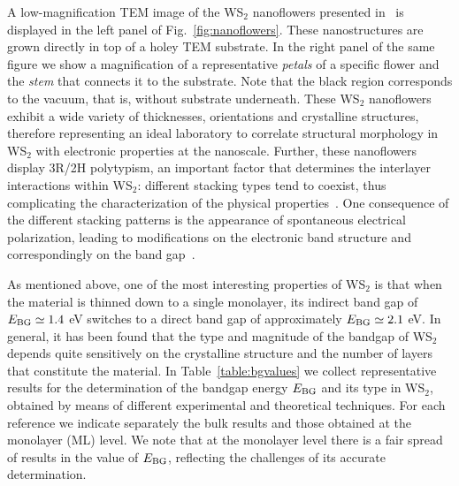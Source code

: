 A low-magnification TEM image of the WS$_2$ nanoflowers presented in~\cite{SabryaWS2} is displayed
in the left panel of Fig.~\ref{fig:nanoflowers}.
%
These nanostructures are grown directly in top of a holey TEM substrate.
%
In the right panel of the same figure we show a magnification of a
      representative {\it petals}
      of a specific flower and the {\it stem} that connects it to the substrate.
      Note that the black region corresponds to the vacuum, that is, without
      substrate underneath.
%
These WS$_2$ nanoflowers exhibit a wide variety of thicknesses, orientations
and crystalline structures, therefore representing an ideal laboratory to correlate
structural morphology in WS$_2$ with electronic properties at the nanoscale.
%
Further, these nanoflowers display 3R/2H polytypism,
an important factor that determines the interlayer
interactions within WS$_2$: different stacking types tend to coexist, 
thus complicating the characterization of the physical properties~\cite{Na:2018}.
%
One consequence of the different stacking patterns is the appearance of
spontaneous electrical polarization, leading to modifications on the 
electronic band structure and correspondingly on the band gap~\cite{Lee:2016}.

As mentioned above, one of the most interesting properties of  WS$_2$ is
that when the material
is thinned down to a single monolayer, its indirect band gap of
$E_{\rm BG}\simeq 1.4$ eV
switches to a direct band gap of approximately $E_{\rm BG}\simeq 2.1$ eV.
%
In general, it has been found that the type and magnitude of the bandgap
of WS$_2$ depends quite sensitively on the crystalline structure and
the number of layers that constitute the material.
%
In Table~\ref{table:bgvalues} we collect
representative results for the determination of the bandgap energy $E_{\rm BG}$
and its type in WS$_2$, obtained by means of different experimental and theoretical techniques.
%
 For each reference we indicate separately the bulk results and those
obtained at the monolayer (ML) level.
%
We note that at the monolayer level there is a fair spread of results in the
value of $E_{\rm BG}$, reflecting the challenges of its accurate determination.
 
